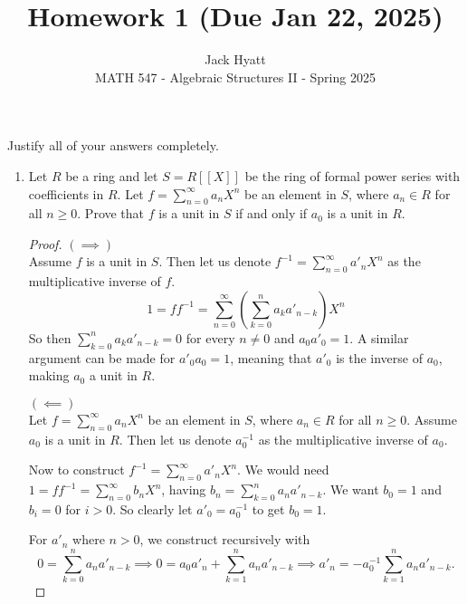 \documentclass[12pt]{article}
\begin{document}
	
	
	
	\title{Homework 1 (Due Jan 22, 2025)}
	\author{Jack Hyatt\\ %
		MATH 547 - Algebraic Structures II - Spring 2025} 
	
	\maketitle
	
	Justify all of your answers completely.\\
	
	
	\medskip 
	
	\begin{enumerate}
		\item Let $R$ be a ring and let $S = R[[X]]$ be the ring of formal power series with coefficients in $R$. Let $f = \sum_{n=0}^{\infty} a_n X^n$ be an element in $S$, where $a_n \in R$ for all $n \geq 0$.
		Prove that $f$ is a unit in $S$ if and only if $a_0$ is a unit in $R$.
		
		\begin{proof}
			$(\implies)$\\
			Assume $f$ is a unit in $S$. Then let us denote $f^{-1} = \sum_{n=0}^{\infty} a'_n X^n$ as the multiplicative inverse of $f$.
			\[1 = ff^{-1} = \sum_{n=0}^{\infty}(\sum_{k=0}^{n} a_ka'_{n-k})X^n\]
			So then $\sum_{k=0}^{n} a_ka'_{n-k} = 0$ for every $n\neq0$ and $a_0a'_0 = 1$. A similar argument can be made for $a'_0a_0=1$, meaning that $a'_0$ is the inverse of $a_0$, making $a_0$ a unit in $R$.
			
			$(\impliedby)$\\
			Let $f = \sum_{n=0}^{\infty} a_n X^n$ be an element in $S$, where $a_n \in R$ for all $n \geq 0$. Assume $a_0$ is a unit in $R$. Then let us denote $a_0^{-1}$ as the multiplicative inverse of $a_0$.
			
			Now to construct $f^{-1} = \sum_{n=0}^{\infty} a'_n X^n$. We would need $1 = ff^{-1} = \sum_{n=0}^{\infty} b_n X^n$, having $b_n = \sum_{k=0}^{n}a_n a'_{n-k}$. We want $b_0 = 1$ and $b_i = 0$ for $i>0$. So clearly let $a'_0 = a_0^{-1}$ to get $b_0=1$.
			
			For $a'_n$ where $n>0$, we construct recursively with
			\[0 = \sum_{k=0}^{n}a_n a'_{n-k} \implies 0 = a_0a'_n + \sum_{k=1}^{n} a_na'_{n-k} \implies a'_n = -a_0^{-1}\sum_{k=1}^{n} a_na'_{n-k}.\]
			

\end{proof}
\end{enumerate}
\end{document}

